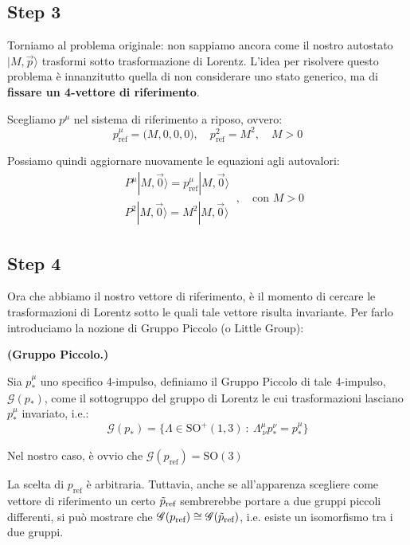 \documentclass[../main.tex]{subfiles}
\begin{document}
\subsection{Step 3}
Torniamo al problema originale: non sappiamo ancora come il nostro autostato $|M, \Vec{p}\rangle$ trasformi sotto trasformazione di Lorentz. L'idea per risolvere questo problema è innanzitutto quella di non considerare uno stato generico, ma di \textbf{fissare un 4-vettore di riferimento}. 

Scegliamo $p^\mu$ nel sistema di riferimento a riposo, ovvero:  
\[
p^\mu_\text{ref} = \big(M,0,0,0\big), \quad p^2_\text{ref} = M^2, \quad M>0
\]

Possiamo quindi aggiornare nuovamente le equazioni agli autovalori:
\[
\boxed{
    \begin{aligned}
        &P^\mu|M, \Vec{0}\rangle = p^\mu_\text{ref}|M, \Vec{0}\rangle\\
        &P^2|M, \Vec{0}\rangle = M^2|M, \Vec{0}\rangle
    \end{aligned}
}~, \quad \text{con } M>0
\]

\subsection{Step 4}
Ora che abbiamo il nostro vettore di riferimento, è il momento di cercare le trasformazioni di Lorentz sotto le quali tale vettore risulta invariante. Per farlo introduciamo la nozione di Gruppo Piccolo (o Little Group):

\begin{definition}
    \textbf{(Gruppo Piccolo.)}
    
    Sia \(p^\mu_\ast\) uno specifico 4-impulso, definiamo il Gruppo Piccolo di tale 4-impulso, $\mathscr G(p_\ast)$, come il sottogruppo del gruppo di Lorentz le cui trasformazioni lasciano \(p^\mu_\ast\) invariato, i.e.:
    \[
    \mathscr G(p_\ast) = \Big\{ \Lambda\in \text{SO}^+(1,3) ~:~ \Lambda^\mu_{~\nu}p^\nu_\ast = p^\mu_\ast \Big\}
    \]
\end{definition}

Nel nostro caso, è ovvio che \(\boxed{\mathscr G(p_\text{ref}) = \text{SO}(3)}\)
\begin{nota}
    La scelta di $p_\text{ref}$ è arbitraria. Tuttavia, anche se all'apparenza scegliere come vettore di riferimento un certo $\Tilde p_\text{ref}$ sembrerebbe portare a due gruppi piccoli differenti, si può mostrare che \(\mathscr G(p_\text{ref})\cong\mathscr G(\Tilde p_\text{ref})\), i.e. esiste un isomorfismo tra i due gruppi.
\end{nota}
\end{document}
